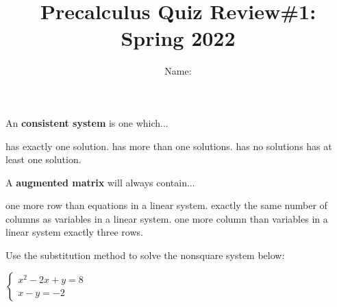 \documentclass{exam}
\title{Precalculus Quiz Review\#1: Spring 2022  }
\author{  Name:   }
\begin{document}
\maketitle
\thispagestyle{empty}

\begin{questions}
\question 

\begin{multicols}{2}
An \textbf{consistent system} is one  which... 

\columnbreak
\begin{choices}
\choice has exactly one solution.
\choice has more than one solutions.
\choice has no solutions
\choice has at least one solution.
\end{choices}

\end{multicols}



\question
\begin{multicols}{2}
A \textbf{augmented matrix} will always contain...

\columnbreak

\begin{choices}
\choice one more row than equations in a linear system.
\choice exactly the same number of columns as variables in a linear system.
\choice one more column than variables in a linear system
\choice  exactly three rows.
\end{choices}
\end{multicols}


\question 
\label{two}
Use the substitution method to solve the nonsquare system below:

$
\begin{cases}
x^2 -2x + y = 8 \\
x - y = -2
\end{cases}
$


\makeemptybox{2in}


\question


\end{questions}
\end{document}
